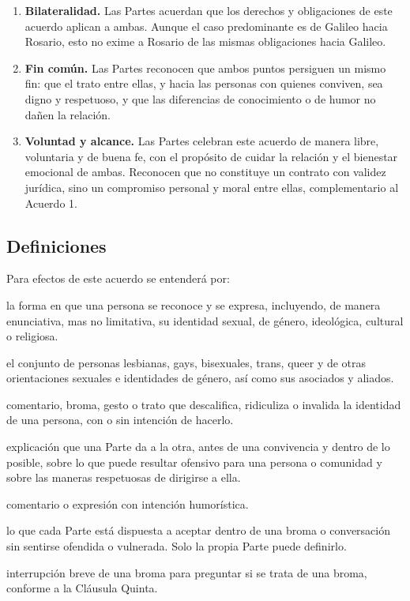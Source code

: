 \begin{enumerate}[label=\Roman*., leftmargin=*, itemsep=0.4em]
  \item \textbf{Bilateralidad.} Las Partes acuerdan que los derechos y obligaciones de este acuerdo aplican a ambas. Aunque el caso predominante es de Galileo hacia Rosario, esto no exime a Rosario de las mismas obligaciones hacia Galileo.

  \item \textbf{Fin común.} Las Partes reconocen que ambos puntos persiguen un mismo fin: que el trato entre ellas, y hacia las personas con quienes conviven, sea digno y respetuoso, y que las diferencias de conocimiento o de humor no dañen la relación.

  \item \textbf{Voluntad y alcance.} Las Partes celebran este acuerdo de manera libre, voluntaria y de buena fe, con el propósito de cuidar la relación y el bienestar emocional de ambas. Reconocen que no constituye un contrato con validez jurídica, sino un compromiso personal y moral entre ellas, complementario al Acuerdo 1.
\end{enumerate}

\subsection*{Definiciones}

Para efectos de este acuerdo se entenderá por:

\begin{description}[leftmargin=0pt, itemsep=0.3em]
  \item[Identidad:] la forma en que una persona se reconoce y se expresa, incluyendo, de manera enunciativa, mas no limitativa, su identidad sexual, de género, ideológica, cultural o religiosa.
  \item[Comunidad LGBTQ+:] el conjunto de personas lesbianas, gays, bisexuales, trans, queer y de otras orientaciones sexuales e identidades de género, así como sus asociados y aliados.
  \item[Expresión ofensiva:] comentario, broma, gesto o trato que descalifica, ridiculiza o invalida la identidad de una persona, con o sin intención de hacerlo.
  \item[Explicación anticipada:] explicación que una Parte da a la otra, antes de una convivencia y dentro de lo posible, sobre lo que puede resultar ofensivo para una persona o comunidad y sobre las maneras respetuosas de dirigirse a ella.
  \item[Broma:] comentario o expresión con intención humorística.
  \item[Límite personal:] lo que cada Parte está dispuesta a aceptar dentro de una broma o conversación sin sentirse ofendida o vulnerada. Solo la propia Parte puede definirlo.
  \item[Pausa de aclaración:] interrupción breve de una broma para preguntar si se trata de una broma, conforme a la Cláusula Quinta.
\end{description}
